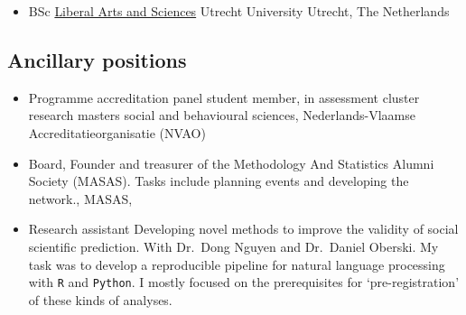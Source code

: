 \documentclass[
  letterpaper,
  DIV=11,
  numbers=noendperiod,
  oneside]{scrartcl}
\providecommand{\tightlist}{%
  \setlength{\itemsep}{0pt}\setlength{\parskip}{0pt}}\usepackage{longtable,booktabs,array}
\begin{document}
\begin{itemize}
\tightlist
\item
  BSc
  \href{https://www.uu.nl/bachelors/liberal-arts-and-sciences}{Liberal
  Arts and Sciences} \textbar{} Utrecht University \textbar{} Utrecht,
  The Netherlands
\end{itemize}

\hypertarget{ancillary-positions}{%
\subsection{Ancillary positions}\label{ancillary-positions}}

{}

\begin{itemize}
\tightlist
\item
  Programme accreditation panel student member, in assessment cluster
  research masters social and behavioural sciences, Nederlands-Vlaamse
  Accreditatieorganisatie (NVAO)
\end{itemize}

{}

\begin{itemize}
\tightlist
\item
  Board, Founder and treasurer of the Methodology And Statistics Alumni
  Society (MASAS). Tasks include planning events and developing the
  network., MASAS,
\end{itemize}

{}

\begin{itemize}
\tightlist
\item
  Research assistant Developing novel methods to improve the validity of
  social scientific prediction. With Dr.~Dong Nguyen and Dr.~Daniel
  Oberski. My task was to develop a reproducible pipeline for natural
  language processing with \texttt{R} and \texttt{Python}. I mostly
  focused on the prerequisites for `pre-registration' of these kinds of
  analyses.
\end{itemize}

{}
\end{document}
